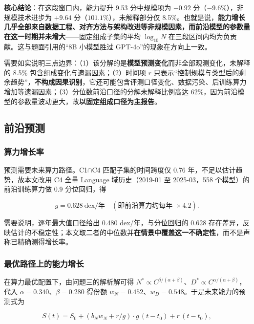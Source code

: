 \textbf{核心结论}：在这段窗口内，能力提升 9.53 分中规模项为 $-0.92$ 分（$-9.6\%$），非规模技术进步为 $+9.64$ 分（$101.1\%$），未解释部分仅 8.5\%。也就是说，\textbf{能力增长几乎全部来自数据工程、对齐方法与架构改进等非规模因素，而前沿模型的参数量在这一时期并未增大}——固定组成子集的平均 $\log_{10}N$ 在三段区间内均为负贡献。这与题面引用的``8B 小模型胜过 GPT-4o''的现象在方向上一致。

需要如实说明三点边界：（1）该分解的是\textbf{模型预测变化}而非全部观测变化，未解释的 8.5\% 包含组成变化与遗漏因素；（2）时间项 $r$ 只表示``控制规模与类型后的剩余趋势''，\textbf{不构成因果识别}，它还可能包含评测口径变化、数据污染、后训练算力增加等遗漏因素；（3）分位数前沿口径的分解未解释比例高达 62\%，因为前沿模型的参数量波动更大，故\textbf{以固定组成口径为主报告}。

\subsection{前沿预测}

\subsubsection{算力增长率}

预测需要未来算力路径。C1$\cap$C4 匹配子集的时间跨度仅 0.76 年，不足以估计趋势，故本文改用 C4 全量 Language 域历史（2019-01 至 2025-03，558 个模型）的前沿训练算力做 0.9 分位回归，得

\begin{equation}
g=0.628\ \text{dex/年}\quad(\text{即前沿算力约每年 } \times4.2).
\end{equation}

需要说明，逐年最大值口径给出 0.480 dex/年，与分位回归的 0.628 存在差异，反映估计的不稳定性；本文取二者的中位数并\textbf{在情景中覆盖这一不确定性}，而不是声称已精确测得增长率。

\subsubsection{最优路径上的能力增长}

在算力最优配置下，由问题三的解析解可得 $N^\ast\propto C^{\beta/(\alpha+\beta)}$、$D^\ast\propto C^{\alpha/(\alpha+\beta)}$，代入 $\alpha=0.340$、$\beta=0.280$ 得份额 $w_N=0.452$、$w_D=0.548$。于是未来能力的预测式为

\begin{equation}
S(t)=S_0+\left(b_N w_N+r/g\right)\cdot g\,(t-t_0)+r\,(t-t_0),
\end{equation}

